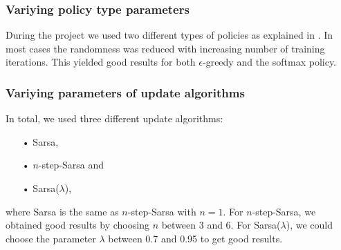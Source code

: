 \subsubsection*{Variying policy type parameters}
During the project we used two different types of policies as explained in \cite{Sutton1998}. In most cases the randomness was reduced with increasing number of training iterations. This yielded good results for both $\epsilon$-greedy and the softmax policy.

\subsubsection*{Variying parameters of update algorithms}
In total, we used three different update algorithms:
\begin{itemize}
\item[•] Sarsa,
\item[•] $n$-step-Sarsa and
\item[•] Sarsa($\lambda$),
\end{itemize}
where Sarsa is the same as $n$-step-Sarsa with $n=1$. For $n$-step-Sarsa, we obtained good results by choosing $n$ between 3 and 6. For Sarsa($\lambda$), we could choose the parameter $\lambda$ between 0.7 and 0.95 to get good results.












